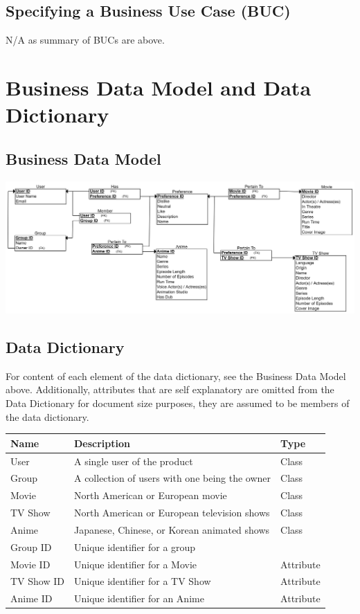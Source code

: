 \documentclass[12pt]{article}
\begin{document}
\subsection{Specifying a Business Use Case (BUC)}
N/A as summary of BUCs are above.

\section{Business Data Model and Data Dictionary}
\subsection{Business Data Model}
\begin{center}
	\includegraphics[scale=0.12]{BusinessDataModel.png}
\end{center}

\subsection{Data Dictionary}
For content of each element of the data dictionary, see the Business Data Model above.
Additionally, attributes that are self explanatory are omitted from the Data Dictionary for document size purposes, they are assumed to be members of the data dictionary.

\begin{tabularx}{\textwidth}{|p{3cm}|p{10cm}|X|}
 	\hline {\bf Name} & {\bf Description} & {\bf Type}\\
	\hline
	User & A single user of the product & Class \\
	Group & A collection of users with one being the owner & Class \\
	Movie & North American or European movie & Class\\
	TV Show & North American or European television shows & Class\\
	Anime & Japanese, Chinese, or Korean animated shows & Class\\
	Group ID & Unique identifier for a group & \\
	Movie ID & Unique identifier for a Movie & Attribute \\
	TV Show ID & Unique identifier for a TV Show & Attribute \\
	Anime ID & Unique identifier for an Anime & Attribute \\
	\hline
\end{tabularx}
\end{document}

